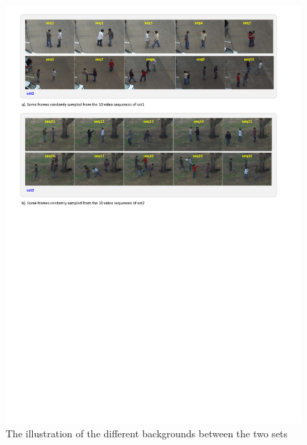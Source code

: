  \begin{figure}
 	\includegraphics[trim=2cm 15.5cm 0cm 1cm]{figs/ut_2sets.pdf}
 	\caption{The illustration of the different backgrounds between the two sets}
 	\label{fig:ut_2sets}
 \end{figure}

